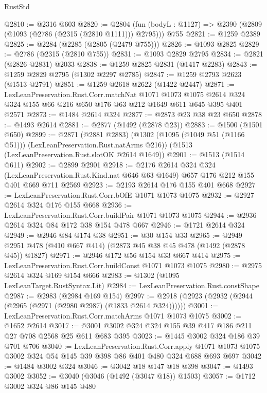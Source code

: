\begin{lexlean}{RustStd}
\begin{coremodule}
@2810 := @2316 @603
@2820 := @2804
    (fun (bodyL : @1127) => @2390 (@2809 (@1093 (@2786 (@2315 (@2810 @1111))) @2795)))
    @755
@2821 := @1259 @2389
@2825 := @2284 (@2285 (@2805 (@2479 @755)))
@2826 := @1093 @2825
@2829 := @2786 (@2315 (@2810 @755))
@2831 := @1093 @2829 @2795
@2834 := @2821 (@2826 @2831) @2033
@2838 := @1259 @2825 @2831 (@1417 @2283)
@2843 := @1259 @2829 @2795 (@1302 @2297 @2785)
@2847 := @1259 @2793 @2623 (@1513 @2791)
@2851 := @1259 @2618 @2622 (@1422 @2447)
@2871 := LexLeanPreservation.Rust.Corr.matchNat
    @1071
    @1073
    @1075
    @2614
    @324
    @324
    @155
    @66
    @216
    @650
    @176
    @63
    @212
    @1649
    @611
    @645
    @395
    @401
    @2571
@2873 := @1484 @2614 @324
@2877 := @2873 @23 @38 @23 @650
@2878 := @1493 @2614
@2881 := @2877 (@1492 (@2878 @23))
@2883 := @1500 (@1501 @650)
@2899 := @2871
    (@2881 @2883)
    (@1302 (@1095 (@1049 @51 (@1166 @51))) (LexLeanPreservation.Rust.natArms @216))
    (@1513 (LexLeanPreservation.Rust.slotOK @2614 @1649))
@2901 := @1513 (@1514 @611)
@2902 := @2899 @2901
@2918 := @2176
    @2614
    @324
    @324
    (LexLeanPreservation.Rust.Kind.nat @646 @63 @1649)
    @657
    @176
    @212
    @155
    @401
    @669
    @711
    @2569
@2923 := @2193 @2614 @176 @155 @401 @668
@2927 := LexLeanPreservation.Rust.Corr.bOfE @1071 @1073 @1075
@2932 := @2927 @2614 @324 @176 @155 @668
@2936 := LexLeanPreservation.Rust.Corr.buildPair @1071 @1073 @1075
@2944 := @2936 @2614 @324 @84 @172 @38 @154 @478 @667
@2946 := @1721 @2614 @324
@2949 := @2946 @84 @174 @38
@2951 := @30 @154 @33
@2965 := @2949 @2951 @478 (@410 @667 @414) (@2873 @45 @38 @45 @478 (@1492 (@2878 @45)) @1827)
@2971 := @2946 @172 @56 @154 @33 @667 @414
@2975 := LexLeanPreservation.Rust.Corr.buildConst @1071 @1073 @1075
@2980 := @2975 @2614 @324 @169 @154 @666
@2983 := @1302 (@1095 LexLeanTarget.RustSyntax.Lit)
@2984 := LexLeanPreservation.Rust.constShape
@2987 := @2983 (@2984 @169 @154)
@2997 := @2918 (@2923 (@2932 (@2944 (@2965 (@2971 (@2980 @2987) (@1833 @2614 @324))))))
@3001 := LexLeanPreservation.Rust.Corr.matchArms @1071 @1073 @1075
@3002 := @1652 @2614
@3017 := @3001 @3002 @324 @324 @155 @39 @417 @186 @211 @27 @708 @2568 @25 @611 @683 @395
@3023 := @1445 @3002 @324 @186 @39 @701 @706
@3040 := LexLeanPreservation.Rust.Corr.apply
    @1071
    @1073
    @1075
    @3002
    @324
    @54
    @145
    @39
    @398
    @86
    @401
    @480
    @324
    @688
    @693
    @697
@3042 := @1484 @3002 @324
@3046 := @3042 @18 @147 @18 @398
@3047 := @1493 @3002
@3052 := @3040 (@3046 (@1492 (@3047 @18)) @1503)
@3057 := @1712 @3002 @324 @86 @145 @480

\end{coremodule}
\end{lexlean}
